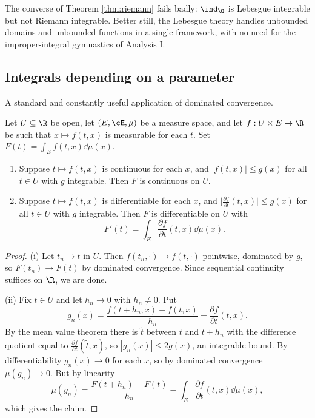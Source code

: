 The converse of Theorem \ref{thm:riemann} fails badly: $\ind_\Q$ is Lebesgue integrable but not Riemann integrable. Better still, the Lebesgue theory handles unbounded domains and unbounded functions in a single framework, with no need for the improper-integral gymnastics of Analysis I.

\subsection{Integrals depending on a parameter}

A standard and constantly useful application of dominated convergence.

\begin{theorem}\label{thm:diff-under}
	Let $U \subseteq \R$ be open, let $(E,\cE,\mu)$ be a measure space, and let $f : U \times E \to \R$ be such that $x \mapsto f(t,x)$ is measurable for each $t$. Set $F(t) = \int_E f(t,x)\dd\mu(x)$.
	\begin{enumerate}[label=(\roman*)]
		\item Suppose $t \mapsto f(t,x)$ is continuous for each $x$, and $|f(t,x)| \leq g(x)$ for all $t \in U$ with $g$ integrable. Then $F$ is continuous on $U$.
		\item Suppose $t\mapsto f(t,x)$ is differentiable for each $x$, and $\big|\frac{\partial f}{\partial t}(t,x)\big| \leq g(x)$ for all $t \in U$ with $g$ integrable. Then $F$ is differentiable on $U$ with
		$$
		F'(t) = \int_E \frac{\partial f}{\partial t}(t,x)\dd\mu(x).
		$$
	\end{enumerate}
\end{theorem}
\begin{proof}
	(i) Let $t_n \to t$ in $U$. Then $f(t_n, \cdot) \to f(t,\cdot)$ pointwise, dominated by $g$, so $F(t_n)\to F(t)$ by dominated convergence. Since sequential continuity suffices on $\R$, we are done.

	(ii) Fix $t \in U$ and let $h_n \to 0$ with $h_n \neq 0$. Put
	$$
	g_n(x) = \frac{f(t+h_n,x)-f(t,x)}{h_n} - \frac{\partial f}{\partial t}(t,x).
	$$
	By the mean value theorem there is $\tilde t$ between $t$ and $t+h_n$ with the difference quotient equal to $\frac{\partial f}{\partial t}(\tilde t, x)$, so $|g_n(x)| \leq 2g(x)$, an integrable bound. By differentiability $g_n(x)\to 0$ for each $x$, so by dominated convergence $\mu(g_n)\to 0$. But by linearity
	$$
	\mu(g_n) = \frac{F(t+h_n)-F(t)}{h_n} - \int_E \frac{\partial f}{\partial t}(t,x)\dd\mu(x),
	$$
	which gives the claim.
\end{proof}

